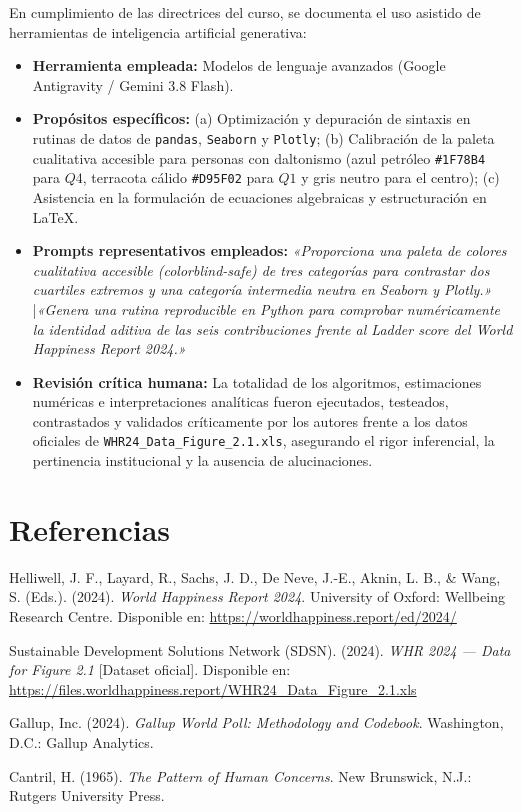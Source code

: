 \documentclass[11pt]{article}
\begin{document}
En cumplimiento de las directrices del curso, se documenta el uso asistido de herramientas de inteligencia artificial generativa:
\begin{itemize}
    \item \textbf{Herramienta empleada:} Modelos de lenguaje avanzados (Google Antigravity / Gemini 3.8 Flash).
    \item \textbf{Propósitos específicos:} (a) Optimización y depuración de sintaxis en rutinas de datos de \texttt{pandas}, \texttt{Seaborn} y \texttt{Plotly}; (b) Calibración de la paleta cualitativa accesible para personas con daltonismo (azul petróleo \texttt{\#1F78B4} para $Q4$, terracota cálido \texttt{\#D95F02} para $Q1$ y gris neutro para el centro); (c) Asistencia en la formulación de ecuaciones algebraicas y estructuración en \LaTeX{}.
    \item \textbf{Prompts representativos empleados:} \textit{«Proporciona una paleta de colores cualitativa accesible (colorblind-safe) de tres categorías para contrastar dos cuartiles extremos y una categoría intermedia neutra en Seaborn y Plotly.»} \quad|\quad \textit{«Genera una rutina reproducible en Python para comprobar numéricamente la identidad aditiva de las seis contribuciones frente al Ladder score del World Happiness Report 2024.»}
    \item \textbf{Revisión crítica humana:} La totalidad de los algoritmos, estimaciones numéricas e interpretaciones analíticas fueron ejecutados, testeados, contrastados y validados críticamente por los autores frente a los datos oficiales de \texttt{WHR24\_Data\_Figure\_2.1.xls}, asegurando el rigor inferencial, la pertinencia institucional y la ausencia de alucinaciones.
\end{itemize}

\enlargethispage{2\baselineskip}
\section*{Referencias}

\begin{enumerate}[label={[\arabic*]}, leftmargin=*, noitemsep]
    \item Helliwell, J. F., Layard, R., Sachs, J. D., De Neve, J.-E., Aknin, L. B., \& Wang, S. (Eds.). (2024). \textit{World Happiness Report 2024}. University of Oxford: Wellbeing Research Centre. Disponible en: \url{https://worldhappiness.report/ed/2024/}
    \item Sustainable Development Solutions Network (SDSN). (2024). \textit{WHR 2024 --- Data for Figure 2.1} [Dataset oficial]. Disponible en: \url{https://files.worldhappiness.report/WHR24_Data_Figure_2.1.xls}
    \item Gallup, Inc. (2024). \textit{Gallup World Poll: Methodology and Codebook}. Washington, D.C.: Gallup Analytics.
    \item Cantril, H. (1965). \textit{The Pattern of Human Concerns}. New Brunswick, N.J.: Rutgers University Press.
\end{enumerate}
\end{document}
